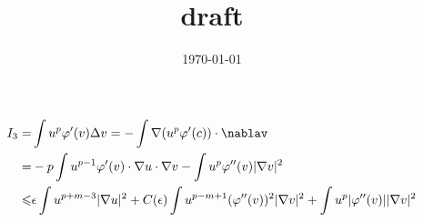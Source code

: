 \documentclass[12pt,]{article}
\title{draft}
\date{\today}
\begin{document}


\begin{equation}
  \begin{aligned}
    I_3=&\int u^p\varphi'(v)\Delta v = -\int \nabla(u^p\varphi'(c))\cdot\nablav\\
    =&-p\int u^{p-1}\varphi'(v)\cdot \nabla u\cdot\nabla v - \int u^p\varphi''(v)|\nabla v|^2\\
    \leqslant & \epsilon\int u^{p+m-3}|\nabla u |^{2}+C(\epsilon)\int u^{p-m+1}(\varphi''(v))^2|\nabla v|^2 + \int u^p|\varphi''(v)||\nabla v|^2
  \end{aligned}
\end{equation}


% 
\end{document}

